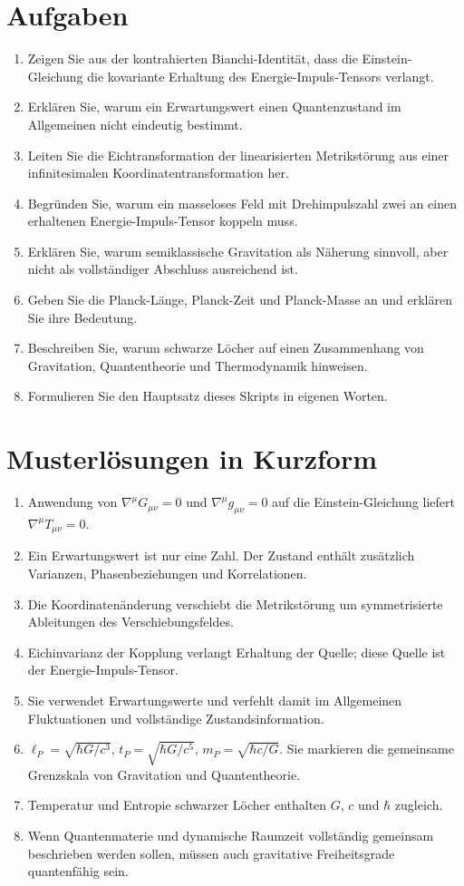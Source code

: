 \documentclass[11pt,a4paper,openany]{book}
\theoremstyle{remark}
\begin{document}
\section*{Aufgaben}
\begin{enumerate}
\item Zeigen Sie aus der kontrahierten Bianchi-Identität, dass die Einstein-Gleichung die kovariante Erhaltung des Energie-Impuls-Tensors verlangt.
\item Erklären Sie, warum ein Erwartungswert einen Quantenzustand im Allgemeinen nicht eindeutig bestimmt.
\item Leiten Sie die Eichtransformation der linearisierten Metrikstörung aus einer infinitesimalen Koordinatentransformation her.
\item Begründen Sie, warum ein masseloses Feld mit Drehimpulszahl zwei an einen erhaltenen Energie-Impuls-Tensor koppeln muss.
\item Erklären Sie, warum semiklassische Gravitation als Näherung sinnvoll, aber nicht als vollständiger Abschluss ausreichend ist.
\item Geben Sie die Planck-Länge, Planck-Zeit und Planck-Masse an und erklären Sie ihre Bedeutung.
\item Beschreiben Sie, warum schwarze Löcher auf einen Zusammenhang von Gravitation, Quantentheorie und Thermodynamik hinweisen.
\item Formulieren Sie den Hauptsatz dieses Skripts in eigenen Worten.
\end{enumerate}

\section*{Musterlösungen in Kurzform}
\begin{enumerate}
\item Anwendung von $\nabla^\mu G_{\mu\nu}=0$ und $\nabla^\mu g_{\mu\nu}=0$ auf die Einstein-Gleichung liefert $\nabla^\mu T_{\mu\nu}=0$.
\item Ein Erwartungswert ist nur eine Zahl. Der Zustand enthält zusätzlich Varianzen, Phasenbeziehungen und Korrelationen.
\item Die Koordinatenänderung verschiebt die Metrikstörung um symmetrisierte Ableitungen des Verschiebungsfeldes.
\item Eichinvarianz der Kopplung verlangt Erhaltung der Quelle; diese Quelle ist der Energie-Impuls-Tensor.
\item Sie verwendet Erwartungswerte und verfehlt damit im Allgemeinen Fluktuationen und vollständige Zustandsinformation.
\item $\ell_P=\sqrt{\hbar G/c^3}$, $t_P=\sqrt{\hbar G/c^5}$, $m_P=\sqrt{\hbar c/G}$. Sie markieren die gemeinsame Grenzskala von Gravitation und Quantentheorie.
\item Temperatur und Entropie schwarzer Löcher enthalten $G$, $c$ und $\hbar$ zugleich.
\item Wenn Quantenmaterie und dynamische Raumzeit vollständig gemeinsam beschrieben werden sollen, müssen auch gravitative Freiheitsgrade quantenfähig sein.
\end{enumerate}
\end{document}

